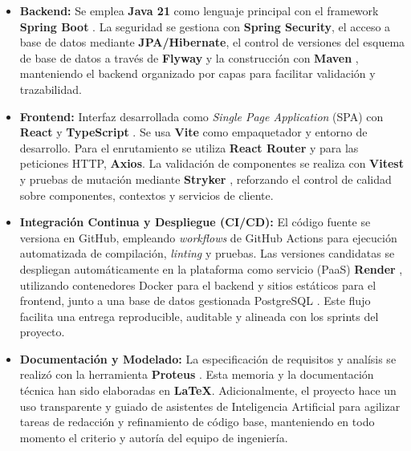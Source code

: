 \begin{itemize}
    \item \textbf{Backend:} Se emplea \textbf{Java 21} como lenguaje principal con el framework \textbf{Spring Boot} \cite{springbootdocs}. La seguridad se gestiona con \textbf{Spring Security}, el acceso a base de datos mediante \textbf{JPA/Hibernate}, el control de versiones del esquema de base de datos a trav\'es de \textbf{Flyway} \cite{flywaydocs} y la construcci\'on con \textbf{Maven} \cite{maven}, manteniendo el backend organizado por capas para facilitar validaci\'on y trazabilidad.
    \item \textbf{Frontend:} Interfaz desarrollada como \emph{Single Page Application} (SPA) con \textbf{React} \cite{reactdocs} y \textbf{TypeScript} \cite{typescript}. Se usa \textbf{Vite} \cite{vite} como empaquetador y entorno de desarrollo. Para el enrutamiento se utiliza \textbf{React Router} y para las peticiones HTTP, \textbf{Axios}. La validaci\'on de componentes se realiza con \textbf{Vitest} \cite{vitestdocs} y pruebas de mutaci\'on mediante \textbf{Stryker} \cite{stryker}, reforzando el control de calidad sobre componentes, contextos y servicios de cliente.
    \item \textbf{Integraci\'on Continua y Despliegue (CI/CD):} El c\'odigo fuente se versiona en GitHub, empleando \emph{workflows} de GitHub Actions \cite{githubactions} para ejecuci\'on automatizada de compilaci\'on, \emph{linting} y pruebas. Las versiones candidatas se despliegan autom\'aticamente en la plataforma como servicio (PaaS) \textbf{Render} \cite{render}, utilizando contenedores Docker \cite{docker} para el backend y sitios est\'aticos para el frontend, junto a una base de datos gestionada PostgreSQL \cite{postgresql}. Este flujo facilita una entrega reproducible, auditable y alineada con los sprints del proyecto.
    \item \textbf{Documentaci\'on y Modelado:} La especificaci\'on de requisitos y anal\'isis se realiz\'o con la herramienta \textbf{Proteus} \cite{proteus}. Esta memoria y la documentaci\'on t\'ecnica han sido elaboradas en \textbf{\LaTeX{}}. Adicionalmente, el proyecto hace un uso transparente y guiado de asistentes de Inteligencia Artificial para agilizar tareas de redacci\'on y refinamiento de c\'odigo base, manteniendo en todo momento el criterio y autor\'ia del equipo de ingenier\'ia.
\end{itemize}
